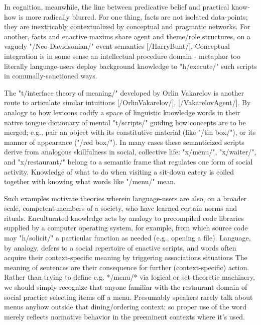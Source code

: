 In cognition, meanwhile, the line between 
predicative belief and practical know-how is more 
radically blurred.  For one thing, facts are not isolated data-points; 
they are inextricably contextualized 
by conceptual and pragmatic networks.  For another, facts and enactive maxims 
share agent and theme/role structures, on a vaguely "/Neo-Davidsonian/" event 
semantics [/HarryBunt/].  
Conceptual integration is in some sense an 
intellectual procedure %
domain -%
metaphor too literally %
language-users deploy background knowledge 
to "h/execute/" such scripts in comunally-sanctioned ways. 

The "t/interface theory of meaning/" developed 
by Orlin Vakarelov is another route to articulate similar intuitions 
[/OrlinVakarelov/], [/VakarelovAgent/].  By analogy to how lexicons codify a space of linguistic 
knowledge %
words in their native tongue %
dictionary of mental "t/scripts/" guiding how concepts are to be 
merged; e.g., pair an object with its 
constitutive material (like "/tin box/"), or its manner of appearance 
("/red box/").  In many cases these semanticized scripts derive 
from analogous skillfulness in social, collective life: "x/menu/", "x/waiter/", and 
"x/restaurant/" belong to a semantic frame that regulates one form 
of social activity.  Knowledge of what to do when visiting a 
sit-down eatery is coiled together with knowing what words like "/menu/" 
mean.  

Such examples motivate theories wherein language-users are 
also, on a broader scale, competent members of a society, who 
have learned certain norms and rituals.  Enculturated 
knowledge acts by analogy to precompiled code libraries supplied 
by a computer operating system, for example, from which source code 
may "h/solicit/" a particular function as needed (e.g., opening 
a file).  Language, by analogy, defers to a social repertoire of 
enactive scripts, and words often acquire their context-specific 
meaning by triggering associations %
situations %
The meaning of sentences are their consequence for further 
(context-specific) action.  
Rather than trying to define e.g. */menu/* via
logical or set-theoretic machinery, we should simply recognize that
anyone familiar with the restaurant domain %
of social practice %
selecting items off a menu. 
Presumably speakers rarely talk about 
menus anyhow outside that dining/ordering context; so proper use 
of the word merely reflects normative behavior in 
the preeminent contexts where it's used.  

